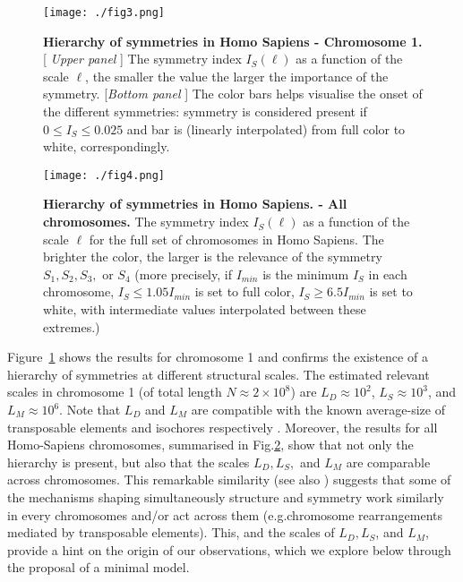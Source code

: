 \documentclass[fleqn,10pt]{wlscirep}
\begin{document}
\begin{figure}[h] 
\centering
\texttt{[image: ./fig3.png]}
\caption{\textbf{Hierarchy of symmetries in Homo Sapiens - Chromosome 1.}  [ {\it Upper panel} ] The symmetry index $I_S( \ell)$ as a function of the scale $\ell$, the smaller the value the larger the importance of the symmetry.  
[{\it Bottom panel} ] The color bars helps visualise the onset of the different symmetries:  symmetry is considered present if $0\le I_S \le 0.025$ and   bar is (linearly interpolated) from full color to white, correspondingly.}
\label{fig.3}
\end{figure}
\begin{figure}[h!] 
\centering
\texttt{[image: ./fig4.png]}
\caption{\textbf{Hierarchy of symmetries in Homo Sapiens. - All chromosomes.}  The symmetry index $I_S( \ell)$ as a function of the scale $\ell$ for the full set of chromosomes in Homo Sapiens. The brighter the color, the larger is the relevance of the symmetry $S_1,S_2,S_3,$ or $S_4$ (more precisely, if $I_{min}$ is the minimum $I_S$ in each chromosome, $I_S \le 1.05 I_{min}$ is set to full color, $I_S \ge 6.5 I_{min}$ is set to white, with intermediate values interpolated between these extremes.) }
\label{fig.4}
\end{figure}





Figure~\ref{fig.3} shows the results for chromosome 1 and confirms the existence of a hierarchy of symmetries  at different structural scales.  The estimated relevant scales  in chromosome 1 (of total length  $N \approx 2 \times 10^8$)  are $L_D\approx 10^2$, $L_S\approx 10^3$, and $L_M\approx 10^6$.  Note that $L_D$ and $L_M$ are compatible with the known average-size of transposable elements and isochores respectively \cite{BOFZSCMR85, CBCHO07}. Moreover,  the results for all Homo-Sapiens chromosomes, summarised in Fig.\ref{fig.4}, show that not only the hierarchy is present, but also that  the scales $L_D,L_S,$ and $L_M$ are comparable across chromosomes. This remarkable similarity (see also \cite{LSBO98,FZW10, BKB14})  suggests that some of the mechanisms shaping  simultaneously  structure  and symmetry work similarly in every chromosomes and/or act across them (e.g.chromosome rearrangements mediated by  transposable elements). This, and the scales of $L_D, L_S$, and $L_M$, provide a hint on the origin of our observations, which we explore below through the proposal of a minimal model.
\end{document}
